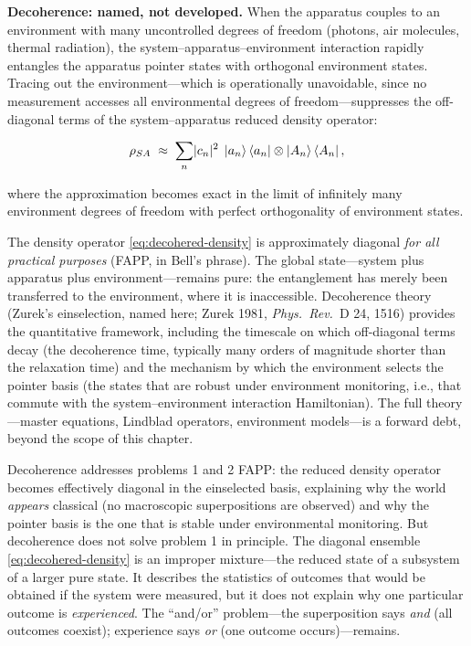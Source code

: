 \medskip\noindent\textbf{Decoherence: named, not developed.}
When the apparatus couples to an environment with many uncontrolled degrees of freedom (photons, air molecules, thermal radiation), the system--apparatus--environment interaction rapidly entangles the apparatus pointer states with orthogonal environment states. Tracing out the environment---which is operationally unavoidable, since no measurement accesses all environmental degrees of freedom---suppresses the off-diagonal terms of the system--apparatus reduced density operator:
\begin{linenomath}
\begin{equation}
\rho_{SA} \;\approx\; \sum_n \lvert c_n\rvert^2\; \ket{a_n}\bra{a_n} \otimes \ket{A_n}\bra{A_n},
\label{eq:decohered-density}
\end{equation}
\end{linenomath}
where the approximation becomes exact in the limit of infinitely many environment degrees of freedom with perfect orthogonality of environment states.

\begin{note}
The density operator \eqref{eq:decohered-density} is approximately diagonal \textit{for all practical purposes} (FAPP, in Bell's phrase). The global state---system plus apparatus plus environment---remains pure: the entanglement has merely been transferred to the environment, where it is inaccessible. Decoherence theory (Zurek's einselection, named here; Zurek 1981, \textit{Phys.\ Rev.}\ D 24, 1516) provides the quantitative framework, including the timescale on which off-diagonal terms decay (the decoherence time, typically many orders of magnitude shorter than the relaxation time) and the mechanism by which the environment selects the pointer basis (the states that are robust under environment monitoring, i.e., that commute with the system--environment interaction Hamiltonian). The full theory---master equations, Lindblad operators, environment models---is a forward debt, beyond the scope of this chapter.
\end{note}

Decoherence addresses problems 1 and 2 FAPP: the reduced density operator becomes effectively diagonal in the einselected basis, explaining why the world \textit{appears} classical (no macroscopic superpositions are observed) and why the pointer basis is the one that is stable under environmental monitoring. But decoherence does not solve problem 1 in principle. The diagonal ensemble \eqref{eq:decohered-density} is an improper mixture---the reduced state of a subsystem of a larger pure state. It describes the statistics of outcomes that would be obtained if the system were measured, but it does not explain why one particular outcome is \textit{experienced}. The ``and/or'' problem---the superposition says \textit{and} (all outcomes coexist); experience says \textit{or} (one outcome occurs)---remains.

